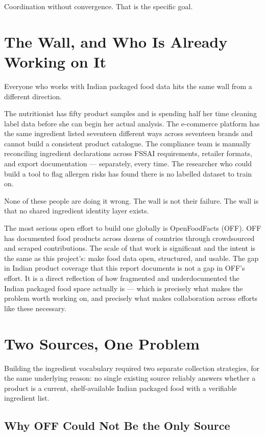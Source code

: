 \documentclass[
  letterpaper,
  DIV=11,
  numbers=noendperiod]{scrartcl}
\begin{document}
Coordination without convergence. That is the specific goal.

\section{The Wall, and Who Is Already Working on
It}\label{the-wall-and-who-is-already-working-on-it}

Everyone who works with Indian packaged food data hits the same wall
from a different direction.

The nutritionist has fifty product samples and is spending half her time
cleaning label data before she can begin her actual analysis. The
e-commerce platform has the same ingredient listed seventeen different
ways across seventeen brands and cannot build a consistent product
catalogue. The compliance team is manually reconciling ingredient
declarations across FSSAI requirements, retailer formats, and export
documentation --- separately, every time. The researcher who could build
a tool to flag allergen risks has found there is no labelled dataset to
train on.

None of these people are doing it wrong. The wall is not their failure.
The wall is that no shared ingredient identity layer exists.

The most serious open effort to build one globally is OpenFoodFacts
(OFF). OFF has documented food products across dozens of countries
through crowdsourced and scraped contributions. The scale of that work
is significant and the intent is the same as this project's: make food
data open, structured, and usable. The gap in Indian product coverage
that this report documents is not a gap in OFF's effort. It is a direct
reflection of how fragmented and underdocumented the Indian packaged
food space actually is --- which is precisely what makes the problem
worth working on, and precisely what makes collaboration across efforts
like these necessary.

\section{Two Sources, One Problem}\label{two-sources-one-problem}

Building the ingredient vocabulary required two separate collection
strategies, for the same underlying reason: no single existing source
reliably answers whether a product is a current, shelf-available Indian
packaged food with a verifiable ingredient list.

\subsection{Why OFF Could Not Be the Only
Source}\label{why-off-could-not-be-the-only-source}
\end{document}
